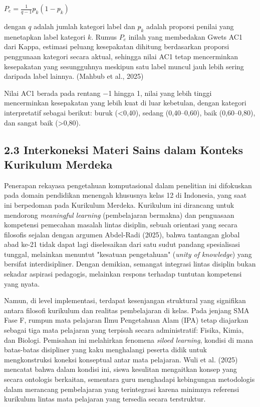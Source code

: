 \documentclass[
]{article}
\begin{document}
\(P_{e} = \frac{1}{q - 1}{p\hat{}}_{k}(1 - {p\hat{}}_{k})\)

dengan \(q\) adalah jumlah kategori label dan \({p\hat{}}_{k}\) adalah
proporsi penilai yang menetapkan label kategori \(k\). Rumus
\(P_{e}\)\hspace{0pt} inilah yang membedakan Gwet\textquotesingle s AC1
dari Kappa, estimasi peluang kesepakatan dihitung berdasarkan proporsi
penggunaan kategori secara aktual, sehingga nilai AC1 tetap mencerminkan
kesepakatan yang sesungguhnya meskipun satu label muncul jauh lebih
sering daripada label lainnya. (Mahbub et al., 2025)

Nilai AC1 berada pada rentang −1 hingga 1, nilai yang lebih tinggi
mencerminkan kesepakatan yang lebih kuat di luar kebetulan, dengan
kategori interpretatif sebagai berikut: buruk (\textless0,40), sedang
(0,40--0,60), baik (0,60--0,80), dan sangat baik (\textgreater0,80).

\hypertarget{interkoneksi-materi-sains-dalam-konteks-kurikulum-merdeka}{%
\subsection{2.3 Interkoneksi Materi Sains dalam Konteks Kurikulum
Merdeka}\label{interkoneksi-materi-sains-dalam-konteks-kurikulum-merdeka}}

Penerapan rekayasa pengetahuan komputasional dalam penelitian ini
difokuskan pada domain pendidikan menengah khususnya kelas 12 di
Indonesia, yang saat ini berpedoman pada Kurikulum Merdeka. Kurikulum
ini dirancang untuk mendorong \emph{meaningful learning} (pembelajaran
bermakna) dan penguasaan kompetensi pemecahan masalah lintas disiplin,
sebuah orientasi yang secara filosofis sejalan dengan argumen Abdel-Radi
(2025), bahwa tantangan global abad ke-21 tidak dapat lagi diselesaikan
dari satu sudut pandang spesialisasi tunggal, melainkan menuntut
"kesatuan pengetahuan" (\emph{unity of knowledge}) yang bersifat
interdisipliner. Dengan demikian, semangat integrasi lintas disiplin
bukan sekadar aspirasi pedagogis, melainkan respons terhadap tuntutan
kompetensi yang nyata.

Namun, di level implementasi, terdapat kesenjangan struktural yang
signifikan antara filosofi kurikulum dan realitas pembelajaran di kelas.
Pada jenjang SMA Fase F, rumpun mata pelajaran Ilmu Pengetahuan Alam
(IPA) tetap diajarkan sebagai tiga mata pelajaran yang terpisah secara
administratif: Fisika, Kimia, dan Biologi. Pemisahan ini melahirkan
fenomena \emph{siloed learning}, kondisi di mana batas-batas disipliner
yang kaku menghalangi peserta didik untuk mengkonstruksi koneksi
konseptual antar mata pelajaran. Wuli et al. (2025) mencatat bahwa dalam
kondisi ini, siswa kesulitan mengaitkan konsep yang secara ontologis
berkaitan, sementara guru menghadapi kebingungan metodologis dalam
merancang pembelajaran yang terintegrasi karena minimnya referensi
kurikulum lintas mata pelajaran yang tersedia secara terstruktur.
\end{document}
